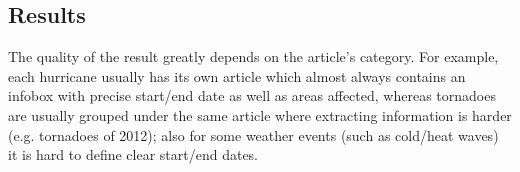 \subsection{Results}
The quality of the result greatly depends on the article's category. For example, each hurricane usually has its own article which almost always contains an infobox with precise start/end date as well as areas affected, whereas tornadoes are usually grouped under the same article where extracting information is harder (e.g. tornadoes of  2012); also for some weather events (such as cold/heat waves) it is hard to define clear start/end dates.
%

